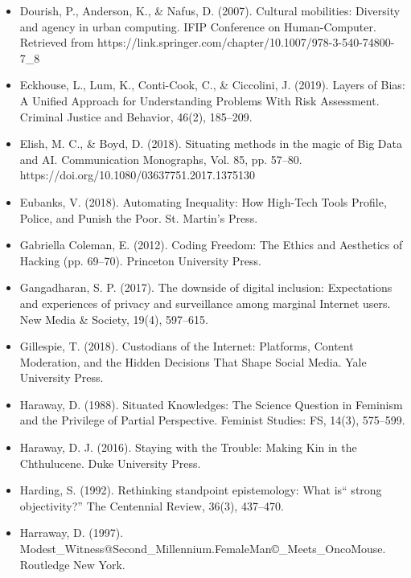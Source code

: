 \documentclass[a4paper,man,natbib]{apa6}
\begin{document}
\begin{itemize}[label={},itemindent=-2em,leftmargin=2em]
   \item Dourish, P., Anderson, K., \& Nafus, D. (2007). Cultural mobilities: Diversity and agency in urban computing. IFIP Conference on Human-Computer. Retrieved from https://link.springer.com/chapter/10.1007/978-3-540-74800-7\_8

   \item Eckhouse, L., Lum, K., Conti-Cook, C., \& Ciccolini, J. (2019). Layers of Bias: A Unified Approach for Understanding Problems With Risk Assessment. Criminal Justice and Behavior, 46(2), 185–209.

   \item Elish, M. C., \& Boyd, D. (2018). Situating methods in the magic of Big Data and AI. Communication Monographs, Vol. 85, pp. 57–80. https://doi.org/10.1080/03637751.2017.1375130

   \item Eubanks, V. (2018). Automating Inequality: How High-Tech Tools Profile, Police, and Punish the Poor. St. Martin’s Press.

   \item Gabriella Coleman, E. (2012). Coding Freedom: The Ethics and Aesthetics of Hacking (pp. 69–70). Princeton University Press.

   \item Gangadharan, S. P. (2017). The downside of digital inclusion: Expectations and experiences of privacy and surveillance among marginal Internet users. New Media \& Society, 19(4), 597–615.

   \item Gillespie, T. (2018). Custodians of the Internet: Platforms, Content Moderation, and the Hidden Decisions That Shape Social Media. Yale University Press.

   \item Haraway, D. (1988). Situated Knowledges: The Science Question in Feminism and the Privilege of Partial Perspective. Feminist Studies: FS, 14(3), 575–599.

   \item Haraway, D. J. (2016). Staying with the Trouble: Making Kin in the Chthulucene. Duke University Press.

   \item Harding, S. (1992). Rethinking standpoint epistemology: What is“ strong objectivity?” The Centennial Review, 36(3), 437–470.

   \item Harraway, D. (1997). Modest\_Witness@Second\_Millennium.FemaleMan\copyright\_Meets\_OncoMouse\texttrademark. Routledge New York.


\end{itemize}
\end{document}
